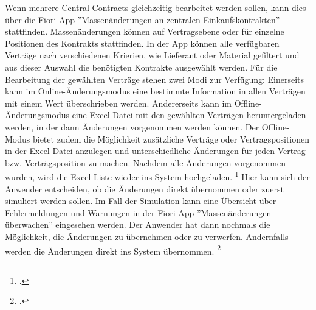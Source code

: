 Wenn mehrere Central Contracts gleichzeitig bearbeitet werden sollen, kann dies über die Fiori-App ''Massenänderungen an zentralen Einkaufskontrakten'' stattfinden. Massenänderungen können auf Vertragsebene oder für einzelne Positionen des Kontrakts stattfinden. In der App können alle verfügbaren Verträge nach verschiedenen Krierien, wie \zB Lieferant oder Material gefiltert und aus dieser Auswahl die benötigten Kontrakte ausgewählt werden. Für die Bearbeitung der gewählten Verträge stehen zwei Modi zur Verfügung: Einerseits kann im Online-Änderungsmodus eine bestimmte Information in allen Verträgen mit einem Wert überschrieben werden. Andererseits kann im Offline-Änderungsmodus eine Excel-Datei mit den gewählten Verträgen heruntergeladen werden, in der dann Änderungen vorgenommen werden können. Der Offline-Modus bietet zudem die Möglichkeit zusätzliche Verträge oder Vertragspositionen in der Excel-Datei anzulegen und unterschiedliche Änderungen für jeden Vertrag bzw. Verträgsposition zu machen. Nachdem alle Änderungen vorgenommen wurden, wird die Excel-Liste wieder ins System hochgeladen. \footcite[Vgl.][]{theorie_sap_fiori_make_mass_changes_2024} Hier kann sich der Anwender entscheiden, ob die Änderungen direkt übernommen oder zuerst simuliert werden sollen. Im Fall der Simulation kann eine Übersicht über Fehlermeldungen und Warnungen in der Fiori-App ''Massenänderungen überwachen'' eingesehen werden. Der Anwender hat dann nochmals die Möglichkeit, die Änderungen zu übernehmen oder zu verwerfen. Andernfalls werden die Änderungen direkt ins System übernommen. \footcite[Vgl.][]{theorie_sap_fiori_monitor_mass_changes_2024}